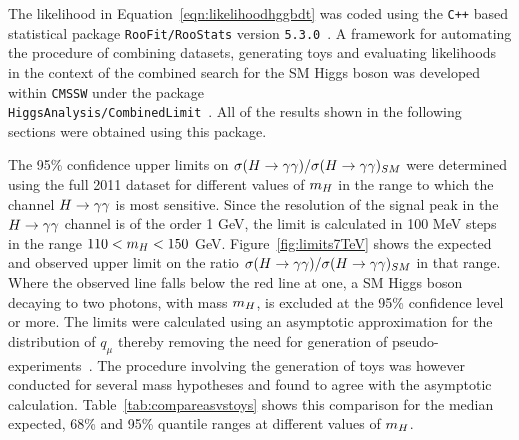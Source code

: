 The likelihood in Equation~\ref{eqn:likelihoodhggbdt} was coded using the \texttt{C++} based 
statistical package \texttt{RooFit/RooStats} version \texttt{5.3.0}~\citep{roofit}. 
A framework for automating the procedure of combining datasets, generating toys
and evaluating likelihoods in the context of the combined search for the SM Higgs boson
was developed within \texttt{CMSSW} 
under the package \\
\texttt{HiggsAnalysis/CombinedLimit}~\citep{combinationstwiki}.
All of the results shown in the following sections were obtained using this package.

The 95\% confidence upper limits on $\sigma(H\rightarrow\gamma\gamma)/\sigma(H\rightarrow\gamma\gamma)_{SM}$ were determined using the full 2011 dataset 
for different values of $m_{H}$ in the range to which the channel $H\rightarrow\gamma\gamma$ is most sensitive.
Since the resolution of the signal peak in the $H\rightarrow\gamma\gamma$ channel is of the order 1 GeV, the limit is calculated
in 100 MeV steps in the range $110 < m_{H} < 150$ GeV. Figure~\ref{fig:limits7TeV} shows the expected and observed
upper limit on the ratio $\sigma(H\rightarrow\gamma\gamma)/\sigma(H\rightarrow\gamma\gamma)_{SM}$ in that range. Where the observed line falls below the red line
at one, a SM Higgs boson decaying to two photons, with mass $m_{H}$, is excluded at the 95\% confidence level or more. 
The limits were calculated using an asymptotic approximation for the distribution of $q_{\mu}$ thereby 
removing the need for generation of pseudo-experiments~\citep{asimov}. The procedure involving the generation of toys
was however conducted for several mass hypotheses and found to agree
with the asymptotic calculation. Table~\ref{tab:compareasvstoys} shows this comparison 
for the median expected, 68\% and 95\% quantile ranges at different values of $m_{H}$.

